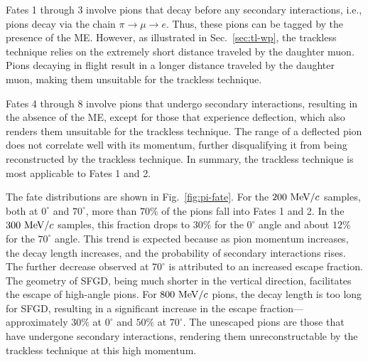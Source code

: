           Fates 1 through 3 involve pions that decay before any secondary interactions, i.e., pions decay via the chain $\pi \rightarrow \mu \rightarrow e$. 
          Thus, these pions can be tagged by the presence of the ME. 
          However, as illustrated in Sec.~\ref{sec:tl-wp}, the trackless technique relies on the extremely short distance traveled by the daughter muon. 
          Pions decaying in flight result in a longer distance traveled by the daughter muon, making them unsuitable for the trackless technique.

          Fates 4 through 8 involve pions that undergo secondary interactions, resulting in the absence of the ME, except for those that experience deflection, which also renders them unsuitable for the trackless technique. 
          The range of a deflected pion does not correlate well with its momentum, further disqualifying it from being reconstructed by the trackless technique. 
          In summary, the trackless technique is most applicable to Fates 1 and 2.

          The fate distributions are shown in Fig.~\ref{fig:pi-fate}. 
          For the $200~\textrm{MeV}/c$ samples, both at $0^\circ$ and $70^\circ$, more than $70\%$ of the pions fall into Fates 1 and 2. 
          In the $300~\textrm{MeV}/c$ samples, this fraction drops to $30\%$ for the $0^\circ$ angle and about $12\%$ for the $70^\circ$ angle. 
          This trend is expected because as pion momentum increases, the decay length increases, and the probability of secondary interactions rises. 
          The further decrease observed at $70^\circ$ is attributed to an increased escape fraction. 
          The geometry of SFGD, being much shorter in the vertical direction, facilitates the escape of high-angle pions. 
          For $800~\textrm{MeV}/c$ pions, the decay length is too long for SFGD, resulting in a significant increase in the escape fraction—approximately $30\%$ at $0^\circ$ and $50\%$ at $70^\circ$. 
          The unescaped pions are those that have undergone secondary interactions, rendering them unreconstructable by the trackless technique at this high momentum.


